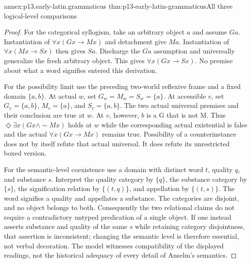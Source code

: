 \begin{annexitem}{annex:p13.early-latin.grammaticus}
 {thm:p13-early-latin-grammaticus}{All three logical-level comparisons}
\begin{proof}
For the categorical syllogism, take an arbitrary object \(a\)
and assume \(Ga\). Instantiation of \(\forall x(Gx\to Mx)\)
and detachment give \(Ma\). Instantiation of
\(\forall x(Mx\to Sx)\) then gives \(Sa\).
Discharge the \(Ga\) assumption and universally generalize the
fresh arbitrary object. This gives \(\forall x(Gx\to Sx)\).
No premise about what a word signifies entered this derivation.

For the possibility limit use the preceding two-world reflexive
frame and a fixed domain \(\{a,b\}\).
At actual \(w\), set \(G_w=M_w=S_w=\{a\}\).
At accessible \(v\), set \(G_v=\{a,b\}\), \(M_v=\{a\}\),
and \(S_v=\{a,b\}\).
The two actual universal premises and their conclusion are true at \(w\).
At \(v\), however, \(b\) is a G that is not M.
Thus \(\Diamond\exists x(Gx\land\sim Mx)\) holds at \(w\)
while the corresponding actual existential is false and the actual
\(\forall x(Gx\to Mx)\) remains true.
Possibility of a counterinstance does not by itself refute that
actual universal. It does refute its unrestricted boxed version.

For the semantic-level coexistence use a domain with distinct
word \(t\), quality \(q\), and substance \(s\).
Interpret the quality category by \(\{q\}\), the substance category
by \(\{s\}\), the signification relation by \(\{(t,q)\}\), and
appellation by \(\{(t,s)\}\).
The word signifies a quality and appellates a substance.
The categories are disjoint, and no object belongs to both.
Consequently the two relational claims do not require a contradictory
untyped predication of a single object.
If one instead asserts substance and quality of the same \(s\)
while retaining category disjointness, that assertion is inconsistent;
changing the semantic level is therefore essential, not verbal decoration.
The model witnesses compatibility of the displayed readings, not
the historical adequacy of every detail of Anselm's semantics.
\end{proof}
\end{annexitem}
